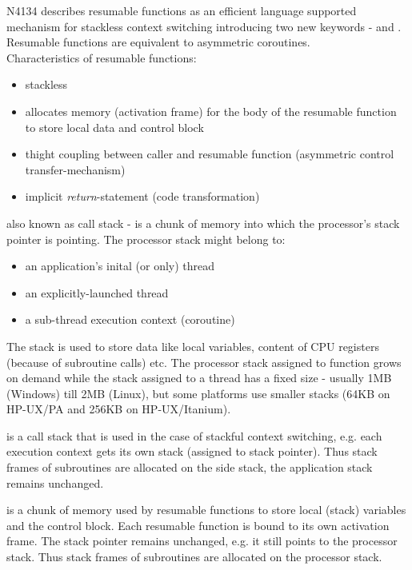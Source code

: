 N4134\cite{N4134} describes resumable functions as an efficient language
supported mechanism for stackless context switching introducing two new keywords
- \await and \yield. Resumable functions are equivalent to asymmetric
coroutines.\\
Characteristics of resumable functions:
\begin{itemize}
    \item stackless
    \item allocates memory (activation frame) for the body of the resumable
          function to store local data and control block
    \item thight coupling between caller and resumable function (asymmetric
          control transfer-mechanism)
    \item implicit \emph{return}-statement\cite{N4134} (code transformation)
\end{itemize}

also known as call stack - is a chunk of memory into which the processor's
stack pointer is pointing. The processor stack might belong to:
\begin{itemize}
    \item an application's inital (or only) thread
    \item an explicitly-launched thread
    \item a sub-thread execution context (coroutine)
\end{itemize}

The stack is used to store data like local variables, content of CPU registers
(because of subroutine calls) etc. The processor stack assigned to function
\main grows on demand while the stack assigned to a thread has a fixed size -
usually 1MB (Windows) till 2MB (Linux), but some platforms use smaller stacks
(64KB on HP-UX/PA and 256KB on HP-UX/Itanium).

is a call stack that is used in the case of stackful context switching, e.g.
each execution context gets its own stack (assigned to stack pointer). Thus
stack frames of subroutines are allocated on the side stack, the application
stack remains unchanged.

is a chunk of memory used by resumable functions to store local (stack)
variables and the control block. Each resumable function is bound to its own
activation frame. The stack pointer remains unchanged, e.g. it still points to
the processor stack. Thus stack frames of subroutines are allocated on the 
processor stack.


